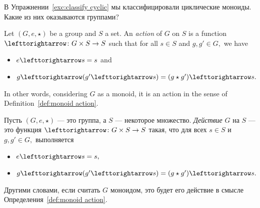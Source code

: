 \documentclass[../main/CT4S-EN-RU]{subfiles}
\begin{document}
\begin{exerciseRUS}
В Упражнении~\ref{exc:classify cyclic} мы классифицировали циклические моноиды. Какие из них оказываются группами? 
\end{exerciseRUS}

\begin{definitionENG}\label{def:group action}
Let $(G,e,\star)$ be a group and $S$ a set. An {\em action} of $G$ on $S$ is a function $\acts\taking G\times S\to S$ such that for all $s\in S$ and $g,g'\in G,$ we have
\begin{itemize}
\item $e\acts s=s$ and
\item $g\acts(g'\acts s)=(g\star g')\acts s.$
\end{itemize}
In other words, considering $G$ as a monoid, it is an action in the sense of Definition~\ref{def:monoid action}.
\end{definitionENG}

\begin{definitionRUS}\label{def:group action}
Пусть $(G,e,\star)$ — это группа, а $S$ — некоторое множество. {\em Действие} $G$ на $S$ — это функция $\acts\taking G\times S\to S$ такая, что для всех $s\in S$ и $g,g'\in G,$ выполняется
\begin{itemize}
\item $e\acts s=s,$
\item $g\acts(g'\acts s)=(g\star g')\acts s.$
\end{itemize}
Другими словами, если считать $G$ моноидом, это будет его действие в смысле Определения~\ref{def:monoid action}.
\end{definitionRUS}
\end{document}
